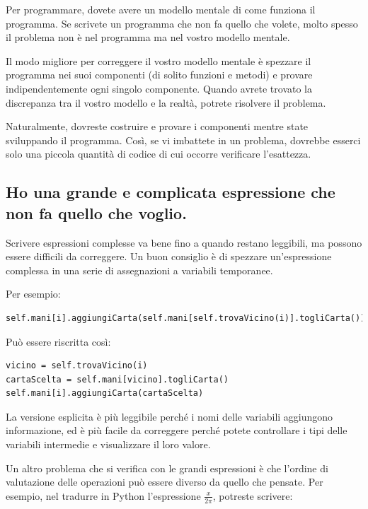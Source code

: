\documentclass[10pt]{book}
\begin{document}
Per programmare, dovete avere un modello mentale di come funziona il programma. Se scrivete un programma che non fa quello che volete, molto spesso il problema non è nel programma ma nel vostro modello mentale.

Il modo migliore per correggere il vostro modello mentale è spezzare il programma nei suoi componenti (di solito funzioni e metodi) e provare indipendentemente ogni singolo componente.
Quando avrete trovato la discrepanza tra il vostro modello e la realtà, potrete risolvere il problema.

Naturalmente, dovreste costruire e provare i componenti mentre state sviluppando il programma. Così, se vi imbattete in un problema, dovrebbe esserci solo una piccola quantità di codice di cui occorre verificare l'esattezza.


\subsection{Ho una grande e complicata espressione che non fa quello che voglio.}

Scrivere espressioni complesse va bene fino a quando restano leggibili, ma possono essere difficili da correggere. Un buon consiglio è di spezzare un'espressione complessa in una serie di assegnazioni a variabili temporanee.

Per esempio:

\begin{verbatim}
self.mani[i].aggiungiCarta(self.mani[self.trovaVicino(i)].togliCarta())
\end{verbatim}
%
Può essere riscritta così:

\begin{verbatim}
vicino = self.trovaVicino(i)
cartaScelta = self.mani[vicino].togliCarta()
self.mani[i].aggiungiCarta(cartaScelta)
\end{verbatim}
%
La versione esplicita è più leggibile perché i nomi delle variabili aggiungono informazione, ed è più facile da correggere perché potete controllare i tipi delle variabili intermedie e visualizzare il loro valore.

Un altro problema che si verifica con le grandi espressioni è che l'ordine di valutazione delle operazioni può essere diverso da quello che pensate.
Per esempio, nel tradurre in Python l'espressione
$\frac{x}{2 \pi}$, potreste scrivere:
\end{document}
